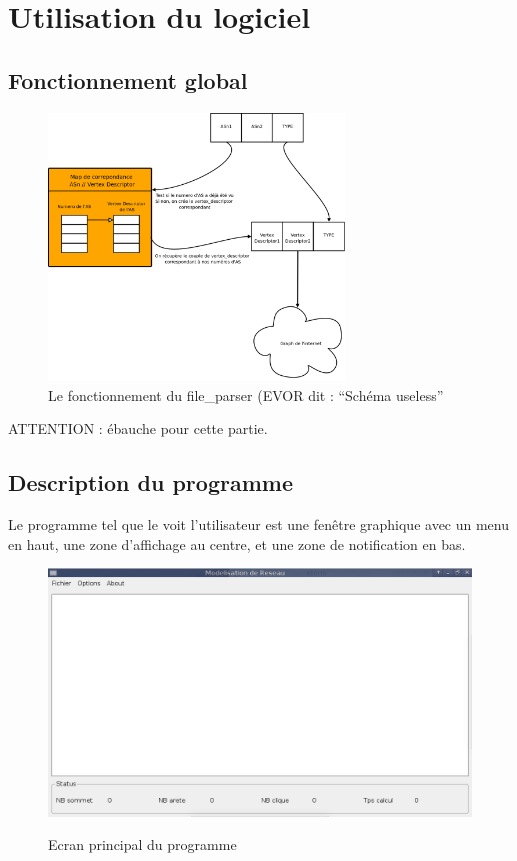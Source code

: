 \section{Utilisation du logiciel}
\subsection{Fonctionnement global}

\begin{figure}[!ht]
\begin{center}
        \includegraphics[width=0.7\textwidth]{./schema/file_parser.png}
\caption{Le fonctionnement du file\_parser (EVOR dit : ``Sch\'ema useless'' }
\label{file_parser}
\end{center}
\end{figure}


ATTENTION : \'ebauche pour cette partie.
\subsection{Description du programme}

Le programme tel que le voit l'utilisateur est une fen\^etre graphique avec un menu en haut, une zone d'affichage au centre, et une zone de notification en bas.

\begin{figure}[ht]
\centering
 \fbox
 {
 \includegraphics[width=16cm]{./schema/capture_ecran_programme.png}
 }
  \caption{\label{ecran_principal}Ecran principal du programme}
\end{figure}


